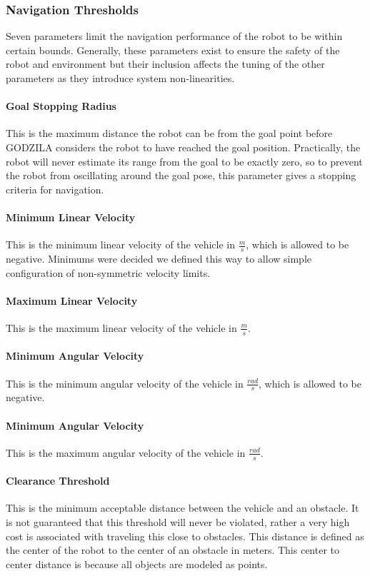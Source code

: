 \subsubsection{Navigation Thresholds}
Seven parameters limit the navigation performance of the robot to be within certain bounds.
Generally, these parameters exist to ensure the safety of the robot and environment
but their inclusion affects the tuning of the other parameters as they introduce
system non-linearities.

\paragraph{Goal Stopping Radius}
This is the maximum distance the robot can be from the goal point before GODZILA considers
the robot to have reached the goal position. Practically, the robot will never estimate its
range from the goal to be exactly zero, so to prevent the robot from oscillating around the
goal pose, this parameter gives a stopping criteria for navigation.

\paragraph{Minimum Linear Velocity}
This is the minimum linear velocity of the vehicle in $\frac{m}{s}$, which is allowed to be negative.
Minimums were decided we defined this way to allow simple configuration of non-symmetric velocity
limits. 

\paragraph{Maximum Linear Velocity}
This is the maximum linear velocity of the vehicle in $\frac{m}{s}$.

\paragraph{Minimum Angular Velocity}
This is the minimum angular velocity of the vehicle in $\frac{rad}{s}$, which is allowed to be negative.

\paragraph{Minimum Angular Velocity}
This is the maximum angular velocity of the vehicle in $\frac{rad}{s}$.

\paragraph{Clearance Threshold}
This is the minimum acceptable distance between the vehicle and an obstacle.
It is not guaranteed that this threshold will never be violated, rather a very high cost
is associated with traveling this close to obstacles.
This distance is defined as the center of the robot to the center of an obstacle in meters.
This center to center distance is because all objects are modeled as points.

